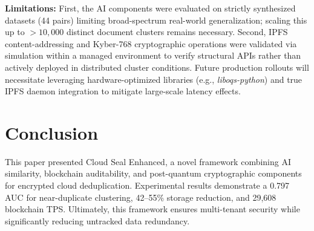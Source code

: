 \documentclass[conference]{IEEEtran}
\begin{document}
\textbf{Limitations:} 
First, the AI components were evaluated on strictly synthesized datasets (44 pairs) limiting broad-spectrum real-world generalization; scaling this up to $>10,000$ distinct document clusters remains necessary. 
Second, IPFS content-addressing and Kyber-768 cryptographic operations were validated via simulation within a managed environment to verify structural APIs rather than actively deployed in distributed cluster conditions. Future production rollouts will necessitate leveraging hardware-optimized libraries (e.g., \textit{liboqs-python}) and true IPFS daemon integration to mitigate large-scale latency effects.

\section{Conclusion}
This paper presented Cloud Seal Enhanced, a novel framework combining AI similarity, blockchain auditability, and post-quantum cryptographic components for encrypted cloud deduplication. Experimental results demonstrate a 0.797 AUC for near-duplicate clustering, 42--55\% storage reduction, and 29,608 blockchain TPS. Ultimately, this framework ensures multi-tenant security while significantly reducing untracked data redundancy.
\end{document}
